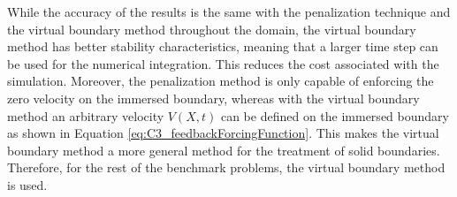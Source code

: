 %
While the accuracy of the results is the same with the penalization technique and the virtual boundary method throughout the domain, the virtual boundary method has better stability characteristics, meaning that a larger time step can be used for the numerical integration. This reduces the cost associated with the simulation. Moreover, the penalization method is only capable of enforcing the zero velocity on the immersed boundary, whereas with the virtual boundary method an arbitrary velocity $V(X, t)$ can be defined on the immersed boundary as shown in Equation \eqref{eq:C3_feedbackForcingFunction}. This makes the virtual boundary method a more general method for the treatment of solid boundaries. Therefore, for the rest of the benchmark problems, the virtual boundary method is used.